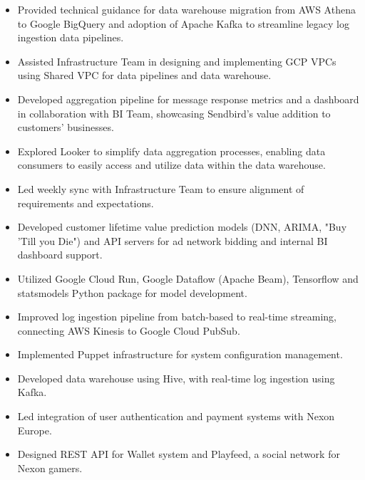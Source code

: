 \documentclass[10pt,a4paper,ragged2e,withhyper]{altacv}
\begin{document}
\begin{itemize}
  \item Provided technical guidance for data warehouse migration from AWS Athena to Google BigQuery and adoption of Apache Kafka to streamline legacy log ingestion data pipelines.
  \item Assisted Infrastructure Team in designing and implementing GCP VPCs using Shared VPC for data pipelines and data warehouse.
  \item Developed aggregation pipeline for message response metrics and a dashboard in collaboration with BI Team, showcasing Sendbird's value addition to customers' businesses.
  \item Explored Looker to simplify data aggregation processes, enabling data consumers to easily access and utilize data within the data warehouse.
  \item Led weekly sync with Infrastructure Team to ensure alignment of requirements and expectations.
\end{itemize}

\divider

\begin{itemize}
  \item Developed customer lifetime value prediction models (DNN, ARIMA, "Buy 'Till you Die") and API servers for ad network bidding and internal BI dashboard support.
  \item Utilized Google Cloud Run, Google Dataflow (Apache Beam), Tensorflow and statsmodels Python package for model development.
  \item Improved log ingestion pipeline from batch-based to real-time streaming, connecting AWS Kinesis to Google Cloud PubSub.
\end{itemize}

\divider

\begin{itemize}
  \item Implemented Puppet infrastructure for system configuration management.
  \item Developed data warehouse using Hive, with real-time log ingestion using Kafka.
  \item Led integration of user authentication and payment systems with Nexon Europe.
  \item Designed REST API for Wallet system and Playfeed, a social network for Nexon gamers.
\end{itemize}
\end{document}
